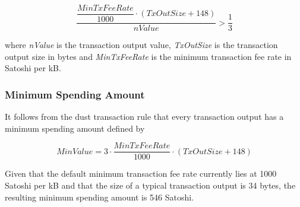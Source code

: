 \begin{appendices}
\begin{equation}
\dfrac{\dfrac{MinTxFeeRate}{1000} \cdot (TxOutSize + 148)}{nValue} > \dfrac{1}{3}
\end{equation}
\vspace{0pt}

\noindent
where \emph{nValue} is the transaction output value, \emph{TxOutSize} is the transaction output size in bytes and \emph{MinTxFeeRate} is the minimum transaction fee rate in Satoshi per kB.

\subsubsection*{Minimum Spending Amount}
It follows from the dust transaction rule that every transaction output has a minimum spending amount defined by

\begin{equation}
MinValue = 3 \cdot \dfrac{MinTxFeeRate}{1000} \cdot (TxOutSize + 148)
\end{equation}

\noindent
Given that the default minimum transaction fee rate currently lies at 1000 Satoshi per kB and that the size of a typical transaction output is 34 bytes, the resulting minimum spending amount is 546 Satoshi.

\end{appendices}